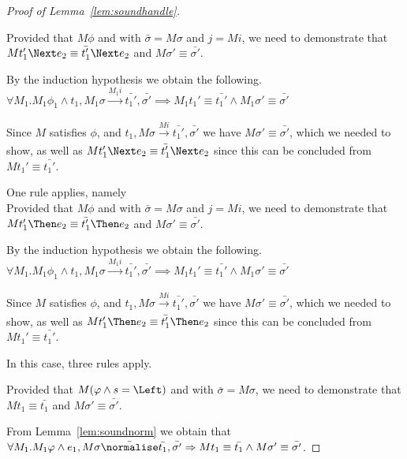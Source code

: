 \begin{proof}[Proof of Lemma~\ref{lem:soundhandle}]
{{      }
    {Provided that $M\phi$ and  with $\bar{\sigma}=M\sigma$ and $j= M i$,
    we need to demonstrate that $M t_1' \Next e_2 \equiv \bar{t_1'}\Next e_2$ and $M\sigma'\equiv\bar{\sigma'}$.

    By the induction hypothesis we obtain the following.\\
    $\forall M_1 . M_1 \phi_1 \land t_1,M_1\sigma \xrightarrow[]{M_1 i} \bar{t_1'},\bar{\sigma'}\implies M_1 t_1'\equiv\bar{t_1'}\land M_1\sigma' \equiv \bar{\sigma'}$

    Since $M$ satisfies $\phi$, and $t_1,M\sigma \xrightarrow[]{M i} \bar{t_1'},\bar{\sigma'}$ we have $M\sigma'\equiv\bar{\sigma'}$,
    which we needed to show, as well as $M t_1' \Next e_2 \equiv \bar{t_1'}\Next e_2$ since this can be concluded from $M t_1'\equiv \bar{t_1'}$.
    }
  }

  {One rule applies, namely \\
  Provided that $M\phi$ and  with $\bar{\sigma}=M\sigma$ and $j= M i$,
  we need to demonstrate that $M t_1'\Then e_2\equiv \bar{t_1'}\Then e_2$ and $M\sigma'\equiv\bar{\sigma'}$.

  By the induction hypothesis we obtain the following.\\
  $\forall M_1 . M_1 \phi_1 \land t_1,M_1\sigma \xrightarrow[]{M_1 i} \bar{t_1'},\bar{\sigma'}\implies M_1 t_1'\equiv\bar{t_1'}\land M_1\sigma' \equiv \bar{\sigma'}$

  Since $M$ satisfies $\phi$, and $t_1,M\sigma \xrightarrow[]{M i} \bar{t_1'},\bar{\sigma'}$ we have $M\sigma'\equiv\bar{\sigma'}$,
  which we needed to show, as well as $M t_1' \Then e_2 \equiv \bar{t_1'}\Then e_2$ since this can be concluded from $M t_1'\equiv \bar{t_1'}$.

  }

  {
  In this case, three rules apply.\\
    {
    }
    {Provided that $M(\phi\wedge s=\Left)$ and  with $\bar{\sigma}=M\sigma$,
    we need to demonstrate that $M t_1\equiv \bar{t_1}$ and $M\sigma'\equiv \bar{\sigma'}$.

    From Lemma~\ref{lem:soundnorm} we obtain that $\forall M_1. M_1 \phi \land e_1,M\sigma\bar{\normalise}\bar{t_1},\bar{\sigma'}\implies M t_1\equiv\bar{t_1}\land M \sigma'\equiv\bar{\sigma'}$.

}}
\end{proof}
